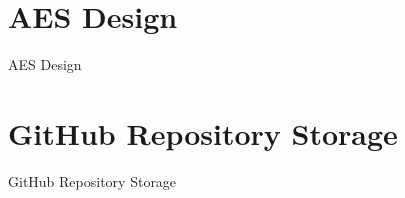 \begin{figure}[h]
\section{AES Design} 
  \centering
  \caption{AES Design}
  
\end{figure}
\begin{figure}[h]
\section{GitHub Repository Storage} 
  \centering
  \caption{GitHub Repository Storage}
  
\end{figure}
